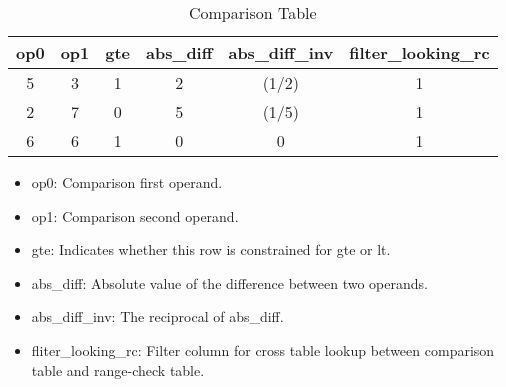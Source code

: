  \label{sec:comparison-table}
\begin{table}[!ht]
    \centering
    \begin{tabular}{|c|c|c|c|c|c|}
        \hline
        \rowcolor{gray} op0 & op1 & gte & abs\_diff & abs\_diff\_inv & filter\_looking\_rc \\
        \hline
        5                   & 3   & 1   & 2         & (1/2)          & 1                   \\
        \hline
        2                   & 7   & 0   & 5         & (1/5)          & 1                   \\
        \hline
        6                   & 6   & 1   & 0         & 0              & 1                   \\
        \hline
    \end{tabular}
    \caption{Comparison Table}
    \label{table:comparison-table}
\end{table}
\begin{itemize}
    \item op0: Comparison first operand.
    \item op1: Comparison second operand.
    \item gte: Indicates whether this row is constrained for gte or lt.
    \item abs\_diff: Absolute value of the difference between two operands.
    \item abs\_diff\_inv: The reciprocal of abs\_diff.
    \item fliter\_looking\_rc: Filter column for cross table lookup between comparison table and range-check table.
\end{itemize}

